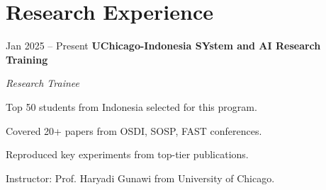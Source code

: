 \section{Research Experience}

\begin{twocolentry}{
    Jan 2025 – Present
}
\textbf{UChicago-Indonesia SYstem and AI Research Training}\end{twocolentry}
\textit{Research Trainee}

\vspace{0.10 cm}
\begin{onecolentry}
    \begin{highlights}
        \item Top 50 students from Indonesia selected for this program.
        \item Covered 20+ papers from OSDI, SOSP, FAST conferences.
        \item Reproduced key experiments from top-tier publications.
        \item Instructor: Prof. Haryadi Gunawi from University of Chicago.
    \end{highlights}
\end{onecolentry}
